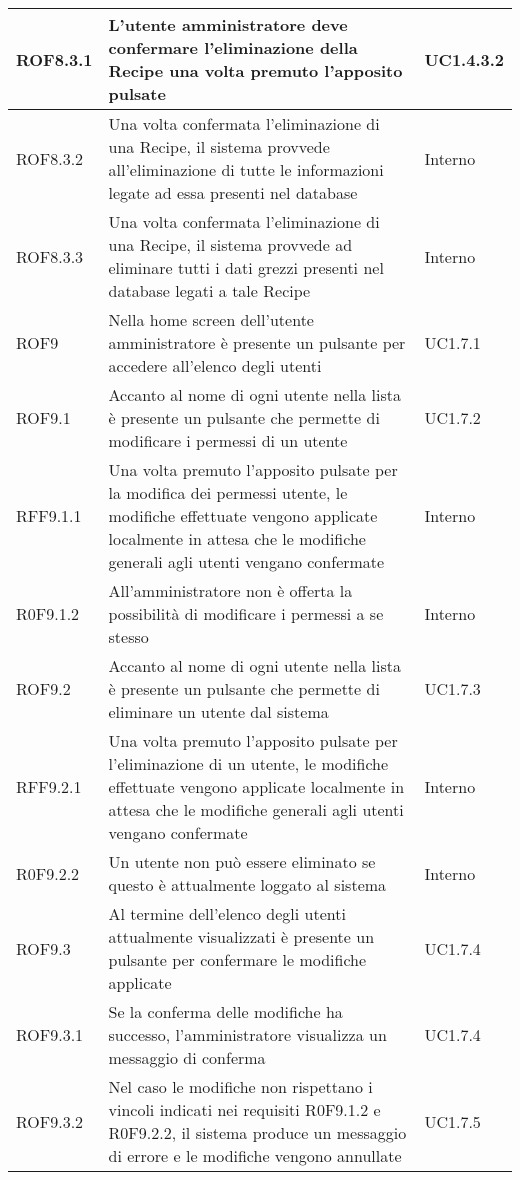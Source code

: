 \begin{center}
\begin{longtable}{| p{2.5cm} | p{8cm} | p{2cm} |}
		\hline
		ROF8.3.1  &  L'utente amministratore deve confermare l'eliminazione della Recipe una volta premuto l'apposito pulsate  &  UC1.4.3.2 \\
		\hline
		ROF8.3.2  &  Una volta confermata l'eliminazione di una Recipe, il sistema provvede all'eliminazione di tutte le informazioni legate ad essa presenti nel database  &  Interno \\
		\hline
		ROF8.3.3  &  Una volta confermata l'eliminazione di una Recipe, il sistema provvede ad eliminare tutti i dati grezzi presenti nel database legati a tale Recipe  &  Interno \\
		\hline


		ROF9  &  Nella home screen dell'utente amministratore è presente un pulsante per accedere all'elenco degli utenti  &  UC1.7.1 \\
		\hline
		ROF9.1  &  Accanto al nome di ogni utente nella lista è presente un pulsante che permette di modificare i permessi di un utente  &  UC1.7.2 \\
		\hline
		RFF9.1.1  &  Una volta premuto l'apposito pulsate per la modifica dei permessi utente, le modifiche effettuate vengono applicate localmente in attesa che le modifiche generali agli utenti vengano confermate  &  Interno \\
		\hline
		R0F9.1.2  &  All'amministratore non è offerta la possibilità di modificare i permessi a se stesso  &  Interno \\
		\hline
		ROF9.2  &  Accanto al nome di ogni utente nella lista è presente un pulsante che permette di eliminare un utente dal sistema  &  UC1.7.3 \\
		\hline
		RFF9.2.1  &  Una volta premuto l'apposito pulsate per l'eliminazione di un utente, le modifiche effettuate vengono applicate localmente in attesa che le modifiche generali agli utenti vengano confermate  &  Interno \\
		\hline
		R0F9.2.2  &  Un utente non può essere eliminato se questo è attualmente loggato al sistema  &  Interno \\
		\hline
		ROF9.3  &  Al termine dell'elenco degli utenti attualmente visualizzati è presente un pulsante per confermare le modifiche applicate  &  UC1.7.4 \\
		\hline
		ROF9.3.1  &  Se la conferma delle modifiche ha successo, l'amministratore visualizza un messaggio di conferma  &  UC1.7.4 \\
		\hline
		ROF9.3.2  &  Nel caso le modifiche non rispettano i vincoli indicati nei requisiti R0F9.1.2 e R0F9.2.2, il sistema produce un messaggio di errore e le modifiche vengono annullate  &  UC1.7.5 \\
		\hline


\end{longtable}
\end{center}
